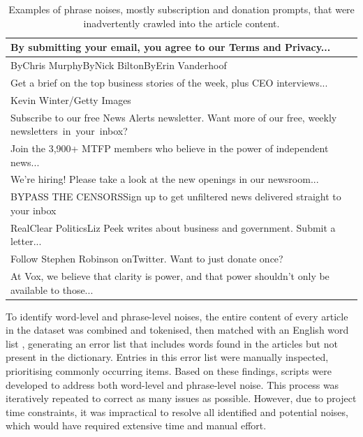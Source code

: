 \begin{table}[htbp]
    \centering
    \scriptsize
    \begin{tabular}{| l |}
        \hline
        By submitting your email, you agree to our Terms and Privacy...                                        \\
        \hline
        ByChris MurphyByNick BiltonByErin Vanderhoof                                                           \\
        \hline
        Get a brief on the top business stories of the week, plus CEO interviews...                            \\
        \hline
        Kevin Winter/Getty Images                                                                              \\
        \hline
        Subscribe to our free News Alerts newsletter. Want more of our free, weekly newsletters in your inbox? \\
        \hline
        Join the 3,900+ MTFP members who believe in the power of independent news...                           \\
        \hline
        We're hiring! Please take a look at the new openings in our newsroom...                                \\
        \hline
        BYPASS THE CENSORSSign up to get unfiltered news delivered straight to your inbox                      \\
        \hline
        RealClear PoliticsLiz Peek writes about business and government. Submit a letter...                    \\
        \hline
        Follow Stephen Robinson onTwitter. Want to just donate once?                                           \\
        \hline
        At Vox, we believe that clarity is power, and that power shouldn’t only be available to those...       \\
        \hline
    \end{tabular}
    \caption{Examples of phrase noises, mostly subscription and donation prompts, that were inadvertently crawled into the article content.}
    \label{table:noise_phrases}
\end{table}

To identify word-level and phrase-level noises, the entire content of every article in the dataset was combined and tokenised, then matched with an English word list \cite{dwyl-english-words}, generating an error list that includes words found in the articles but not present in the dictionary. Entries in this error list were manually inspected, prioritising commonly occurring items. Based on these findings, scripts were developed to address both word-level and phrase-level noise. This process was iteratively repeated to correct as many issues as possible. However, due to project time constraints, it was impractical to resolve all identified and potential noises, which would have required extensive time and manual effort.

